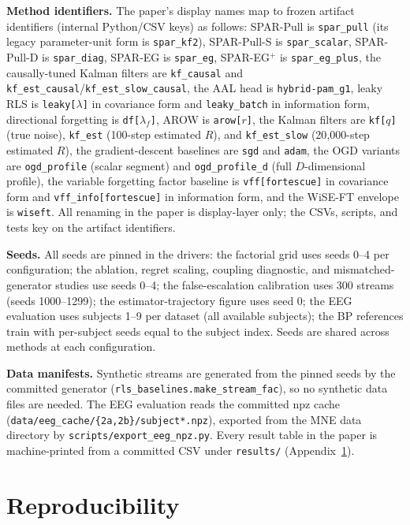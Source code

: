 \textbf{Method identifiers.}
The paper's display names map to frozen artifact identifiers (internal Python/CSV keys) as follows: SPAR-Pull is \texttt{spar\_pull} (its legacy parameter-unit form is \texttt{spar\_kf2}), SPAR-Pull-S is \texttt{spar\_scalar}, SPAR-Pull-D is \texttt{spar\_diag}, SPAR-EG is \texttt{spar\_eg}, SPAR-EG$^+$ is \texttt{spar\_eg\_plus}, the causally-tuned Kalman filters are \texttt{kf\_causal} and \texttt{kf\_est\_causal}/\texttt{kf\_est\_slow\_causal}, the AAL head is \texttt{hybrid-pam\_g1}, leaky RLS is \texttt{leaky[$\lambda$]} in covariance form and \texttt{leaky\_batch} in information form, directional forgetting is \texttt{df[$\lambda_f$]}, AROW is \texttt{arow[$r$]}, the Kalman filters are \texttt{kf[$q$]} (true noise), \texttt{kf\_est} (100-step estimated $R$), and \texttt{kf\_est\_slow} (20{,}000-step estimated $R$), the gradient-descent baselines are \texttt{sgd} and \texttt{adam}, the OGD variants are \texttt{ogd\_profile} (scalar segment) and \texttt{ogd\_profile\_d} (full $D$-dimensional profile), the variable forgetting factor baseline is \texttt{vff[fortescue]} in covariance form and \texttt{vff\_info[fortescue]} in information form, and the WiSE-FT envelope is \texttt{wiseft}.
All renaming in the paper is display-layer only; the CSVs, scripts, and tests key on the artifact identifiers.

\textbf{Seeds.}
All seeds are pinned in the drivers: the factorial grid uses seeds 0--4 per configuration; the ablation, regret scaling, coupling diagnostic, and mismatched-generator studies use seeds 0--4; the false-escalation calibration uses 300 streams (seeds 1000--1299); the estimator-trajectory figure uses seed 0; the EEG evaluation uses subjects 1--9 per dataset (all available subjects); the BP references train with per-subject seeds equal to the subject index.
Seeds are shared across methods at each configuration.

\textbf{Data manifests.}
Synthetic streams are generated from the pinned seeds by the committed generator (\texttt{rls\_baselines.make\_stream\_fac}), so no synthetic data files are needed.
The EEG evaluation reads the committed npz cache (\texttt{data/eeg\_cache/\{2a,2b\}/subject*.npz}), exported from the MNE data directory by \texttt{scripts/export\_eeg\_npz.py}.
Every result table in the paper is machine-printed from a committed CSV under \texttt{results/} (Appendix~\ref{app:repro}).

\section{Reproducibility}
\label{app:repro}
\setcounter{figure}{0}\setcounter{table}{0}

